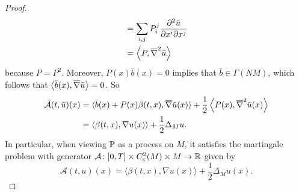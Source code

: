 \begin{proof}
\begin{align*}
        &= \sum_{i,j}P_i^j \frac{\partial^2 \bar{u}}{\partial x^i \partial x^j} \\
        &= \left\langle P,\overline{\nabla}^2 \bar{u} \right\rangle
    \end{align*}
    because $P = P^2$. Moreover, $P(x)\bar{b}(x) = 0$ implies that $\bar{b} \in \Gamma(NM)$, which follows that $\left\langle \bar{b}(x),\overline{\nabla} \bar{u} \right\rangle = 0$. So
    \begin{align*}
        \bar{\mathcal{A}}(t, \bar{u})(x)&=\langle\bar{b}(x)+ P(x) \bar{\beta}(t, x), \overline{\nabla} \bar{u}(x)\rangle+\frac{1}{2}\left\langle P(x), \overline{\nabla}^2 \bar{u}(x)\right\rangle \\
        &=\langle\beta(t, x), \nabla u(x)\rangle+\frac{1}{2} \Delta_M u. \qedhere
    \end{align*}
    In particular, when viewing $\mathbb{P}$ as a process on $M$, it satisfies the martingale problem with generator $\mathcal{A} \colon [0,T] \times C_c^2(M) \times M \rightarrow \mathbb{R}$ given by
    \begin{equation*}
        \mathcal{A}(t,u)(x) = \langle\beta(t, x), \nabla u(x)\rangle+\frac{1}{2} \Delta_M u(x). 
    \end{equation*}
\end{proof}


